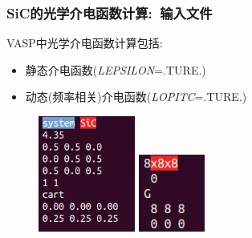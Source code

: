 \frame
{
	\frametitle{\textrm{SiC}的光学介电函数计算:~输入文件}
\textrm{VASP}中光学介电函数计算包括:
\begin{itemize}
	\item 静态介电函数(\textrm{\textit{LEPSILON}=.TURE.})
	\item 动态(频率相关)介电函数(\textrm{\textit{LOPITC}=.TURE.})%
\end{itemize}
\begin{figure}[h!]
\centering
\includegraphics[height=1.5in,viewport=0 15 186 220,clip]{Figures/SiC-optic-POSCAR.png}
\includegraphics[height=1.0in,viewport=0 0 100 110,clip]{Figures/SiC-epsilon-KPOINTS.png}
\caption{\fontsize{6.2pt}{5.2pt}}%
\label{SiC-optic-Input}
\end{figure}
}


